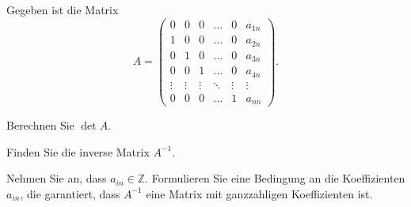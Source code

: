 Gegeben ist die Matrix
\[
A
=
\begin{pmatrix}
0&0&0&\dots&0&a_{1n}\\
1&0&0&\dots&0&a_{2n}\\
0&1&0&\dots&0&a_{3n}\\
0&0&1&\dots&0&a_{4n}\\
\vdots&\vdots&\vdots&\ddots&\vdots&\vdots\\
0&0&0&\dots&1&a_{nn}
\end{pmatrix}.
\]
\begin{teilaufgaben}
\item Berechnen Sie $\det A$.
\item Finden Sie die inverse Matrix $A^{-1}$.
\item Nehmen Sie an, dass $a_{in}\in\mathbb{Z}$.
Formulieren Sie eine Bedingung an die Koeffizienten $a_{in}$, die garantiert,
dass $A^{-1}$ eine Matrix mit ganzzahligen Koeffizienten ist.
\end{teilaufgaben}

